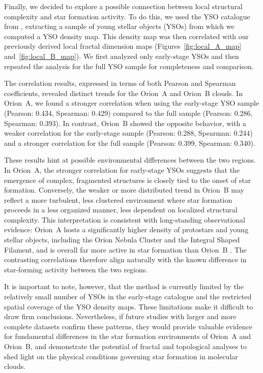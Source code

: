Finally, we decided to explore a possible connection between local structural complexity and star formation activity. To do this, we used the YSO catalogue from \cite{megeath2012catalogue}, extracting a sample of young stellar objects (YSOs) from which we computed a YSO density map. This density map was then correlated with our previously derived local fractal dimension maps (Figures~\ref{fig:local_A_map} and~\ref{fig:local_B_map}). We first analyzed only early-stage YSOs and then repeated the analysis for the full YSO sample for completeness and comparison.

The correlation results, expressed in terms of both Pearson and Spearman coefficients, revealed distinct trends for the Orion~A and Orion~B clouds. In Orion~A, we found a stronger correlation when using the early-stage YSO sample (Pearson: 0.434, Spearman: 0.429) compared to the full sample (Pearson: 0.286, Spearman: 0.393). In contrast, Orion~B showed the opposite behavior, with a weaker correlation for the early-stage sample (Pearson: 0.288, Spearman: 0.244) and a stronger correlation for the full sample (Pearson: 0.399, Spearman: 0.340).

These results hint at possible environmental differences between the two regions.  
In Orion~A, the stronger correlation for early-stage YSOs suggests that the emergence of complex, fragmented structures is closely tied to the onset of star formation.  
Conversely, the weaker or more distributed trend in Orion~B may reflect a more turbulent, less clustered environment where star formation proceeds in a less organized manner, less dependent on localized structural complexity.  
This interpretation is consistent with long-standing observational evidence: Orion~A hosts a significantly higher density of protostars and young stellar objects, including the Orion Nebula Cluster and the Integral Shaped Filament, and is overall far more active in star formation than Orion~B \cite{megeath2012catalogue}.  
The contrasting correlations therefore align naturally with the known difference in star-forming activity between the two regions.

It is important to note, however, that the method is currently limited by the relatively small number of YSOs in the early-stage catalogue and the restricted spatial coverage of the YSO density maps. These limitations make it difficult to draw firm conclusions. Nevertheless, if future studies with larger and more complete datasets confirm these patterns, they would provide valuable evidence for fundamental differences in the star formation environments of Orion~A and Orion~B, and demonstrate the potential of fractal and topological analyses to shed light on the physical conditions governing star formation in molecular clouds.

